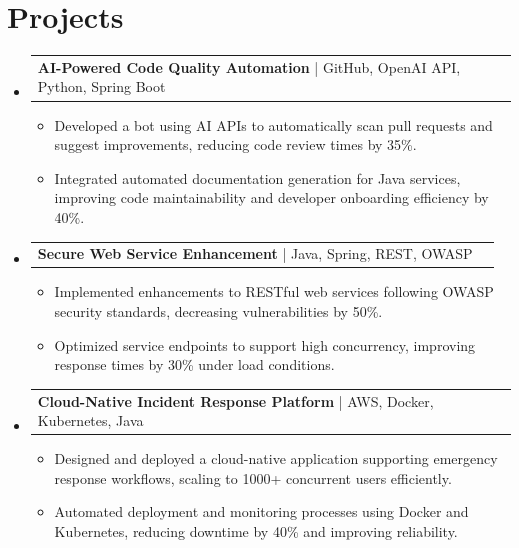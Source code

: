 \documentclass[letterpaper,11pt]{article}
\makeatletter
\newcommand{\resumeItem}[1]{
  \item\footnotesize{
    {#1 \vspace{-2pt}}
  }
}
\newcommand{\resumeProjectHeading}[2]{
    \item
    \begin{tabular*}{1.001\textwidth}{l@{\extracolsep{\fill}}r}
      \small#1 & \textbf{\small #2}\\
    \end{tabular*}\vspace{-7pt}
}
\newcommand{\resumeSubHeadingListStart}{\begin{itemize}[leftmargin=0pt, label={}]}
\newcommand{\resumeSubHeadingListEnd}{\end{itemize}}
\newcommand{\resumeItemListStart}{\begin{itemize}[leftmargin=*]}
\newcommand{\resumeItemListEnd}{\end{itemize}\vspace{-5pt}}
\makeatother
\begin{document}
\section{Projects}
    \vspace{-5pt}
    \resumeSubHeadingListStart
          \resumeProjectHeading
              {\textbf{AI-Powered Code Quality Automation} | GitHub, OpenAI API, Python, Spring Boot}{}
        \resumeItemListStart
            \resumeItem{Developed a bot using AI APIs to automatically scan pull requests and suggest improvements, reducing code review times by 35\%.}
            \resumeItem{Integrated automated documentation generation for Java services, improving code maintainability and developer onboarding efficiency by 40\%.}
        \resumeItemListEnd
        \vspace{-12pt}
    
    \resumeProjectHeading
        {\textbf{Secure Web Service Enhancement} | Java, Spring, REST, OWASP}{}
        \resumeItemListStart
            \resumeItem{Implemented enhancements to RESTful web services following OWASP security standards, decreasing vulnerabilities by 50\%.}
            \resumeItem{Optimized service endpoints to support high concurrency, improving response times by 30\% under load conditions.}
        \resumeItemListEnd
          \vspace{-12pt}
      \resumeProjectHeading
          {\textbf{Cloud-Native Incident Response Platform} | AWS, Docker, Kubernetes, Java}{}
          \resumeItemListStart
              \resumeItem{Designed and deployed a cloud-native application supporting emergency response workflows, scaling to 1000+ concurrent users efficiently.}
              \resumeItem{Automated deployment and monitoring processes using Docker and Kubernetes, reducing downtime by 40\% and improving reliability.}
          \resumeItemListEnd 
    \resumeSubHeadingListEnd
\end{document}
